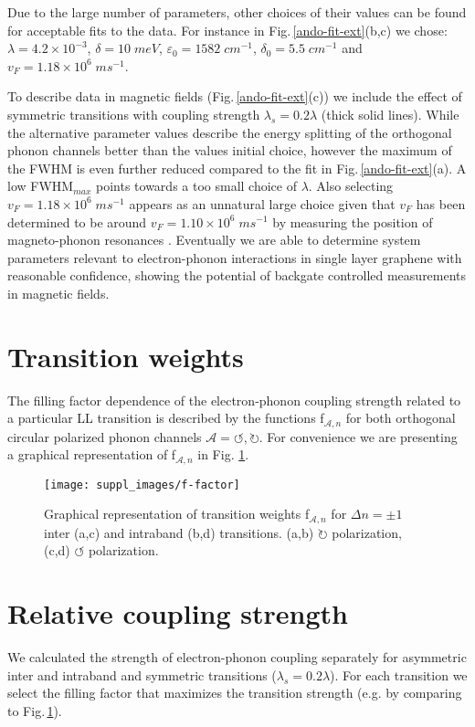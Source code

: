 \documentclass[pra,aps,superscriptaddress,preprint]{revtex4-1}
\begin{document}
Due to the large number of parameters, other choices of their values can be found for acceptable fits to the data. For instance in Fig.\,\ref{ando-fit-ext}(b,c) we chose: $\lambda=4.2\times 10^{-3}$, $\delta=10\; meV$, $\varepsilon_0=1582\; cm^{-1}$, $\delta_0=5.5\; cm^{-1}$ and $v_F=1.18\times 10^6 \; ms^{-1}$.

To describe data in magnetic fields (Fig.\,\ref{ando-fit-ext}(c)) we include the effect of symmetric transitions with coupling strength $\lambda_s=0.2\lambda$ (thick solid lines). While the alternative parameter values describe the energy splitting of the orthogonal phonon channels better than the values initial choice, however the maximum of the FWHM is even further reduced compared to the fit in Fig.\,\ref{ando-fit-ext}(a). A low FWHM$_{max}$ points towards a too small choice of $\lambda$. Also selecting $v_F = 1.18\times 10^6 \; ms^{-1}$ appears as an unnatural large choice given that $v_F$ has been determined to be around $v_F=1.10\times 10^6 \; ms^{-1}$ by measuring the position of magneto-phonon resonances \cite{kossacki2012circular,PhysRevLett.110.227402}. 
Eventually we are able to determine system parameters relevant to electron-phonon interactions in single layer graphene with reasonable confidence, showing the potential of backgate controlled measurements in magnetic fields.

\newpage
\section{Transition weights}
The filling factor dependence of the electron-phonon coupling strength related to a particular LL transition is described by the functions f$_{\mathcal{A},n}$ for both orthogonal circular polarized phonon channels $\mathcal{A}=\circlearrowleft, \circlearrowright$. For convenience we are presenting a graphical representation of f$_{\mathcal{A},n}$ in Fig. \ref{f-factor}.  

\begin{figure}[h!]
   \texttt{[image: suppl\_images/f-factor]}
   \caption{\label{f-factor}Graphical representation of transition weights f$_{\mathcal{A},n}$ for $\Delta n =\pm 1$ inter (a,c) and intraband (b,d) transitions. (a,b) $\circlearrowright$ polarization, (c,d) $\circlearrowleft$ polarization.}
\end{figure}

\newpage
\section{Relative coupling strength}
We calculated the strength of electron-phonon coupling separately for asymmetric inter and intraband and symmetric transitions ($\lambda_s = 0.2\lambda$). For each transition we select the filling factor that maximizes the transition strength (e.g. by comparing to Fig.\,\ref{f-factor}). 
\end{document}
